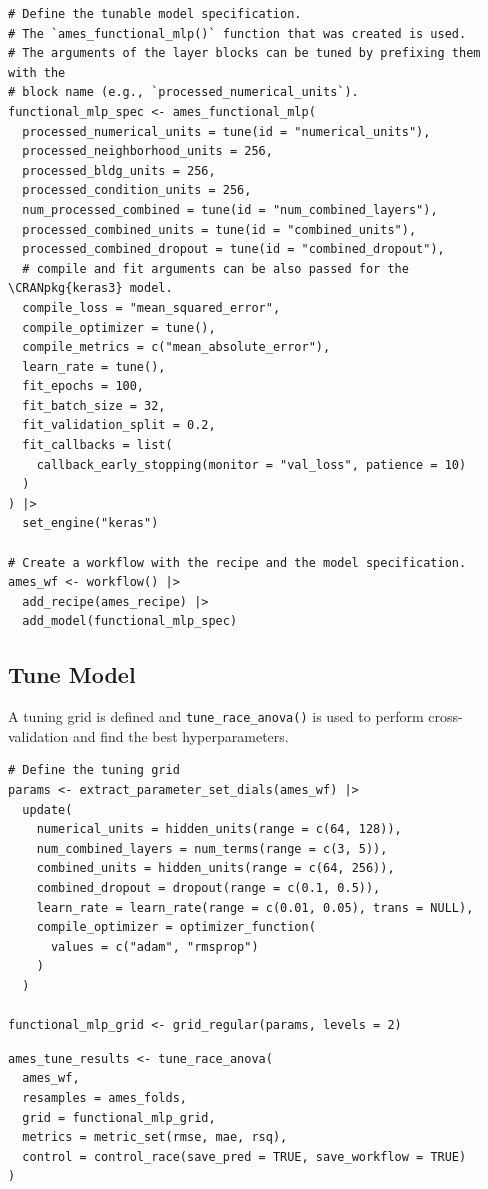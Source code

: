 \begin{verbatim}
# Define the tunable model specification.
# The `ames_functional_mlp()` function that was created is used.
# The arguments of the layer blocks can be tuned by prefixing them with the
# block name (e.g., `processed_numerical_units`).
functional_mlp_spec <- ames_functional_mlp(
  processed_numerical_units = tune(id = "numerical_units"),
  processed_neighborhood_units = 256,
  processed_bldg_units = 256,
  processed_condition_units = 256,
  num_processed_combined = tune(id = "num_combined_layers"),
  processed_combined_units = tune(id = "combined_units"),
  processed_combined_dropout = tune(id = "combined_dropout"),
  # compile and fit arguments can be also passed for the \CRANpkg{keras3} model.
  compile_loss = "mean_squared_error",
  compile_optimizer = tune(),
  compile_metrics = c("mean_absolute_error"),
  learn_rate = tune(),
  fit_epochs = 100,
  fit_batch_size = 32,
  fit_validation_split = 0.2,
  fit_callbacks = list(
    callback_early_stopping(monitor = "val_loss", patience = 10)
  )
) |>
  set_engine("keras")

# Create a workflow with the recipe and the model specification.
ames_wf <- workflow() |>
  add_recipe(ames_recipe) |>
  add_model(functional_mlp_spec)
\end{verbatim}

\subsection{Tune Model}\label{tune-model}

A tuning grid is defined and \texttt{tune\_race\_anova()} is used to perform cross-validation and find the best hyperparameters.

\begin{verbatim}
# Define the tuning grid
params <- extract_parameter_set_dials(ames_wf) |>
  update(
    numerical_units = hidden_units(range = c(64, 128)),
    num_combined_layers = num_terms(range = c(3, 5)),
    combined_units = hidden_units(range = c(64, 256)),
    combined_dropout = dropout(range = c(0.1, 0.5)),
    learn_rate = learn_rate(range = c(0.01, 0.05), trans = NULL),
    compile_optimizer = optimizer_function(
      values = c("adam", "rmsprop")
    )
  )

functional_mlp_grid <- grid_regular(params, levels = 2)
\end{verbatim}

\begin{verbatim}
ames_tune_results <- tune_race_anova(
  ames_wf,
  resamples = ames_folds,
  grid = functional_mlp_grid,
  metrics = metric_set(rmse, mae, rsq),
  control = control_race(save_pred = TRUE, save_workflow = TRUE)
)
\end{verbatim}

